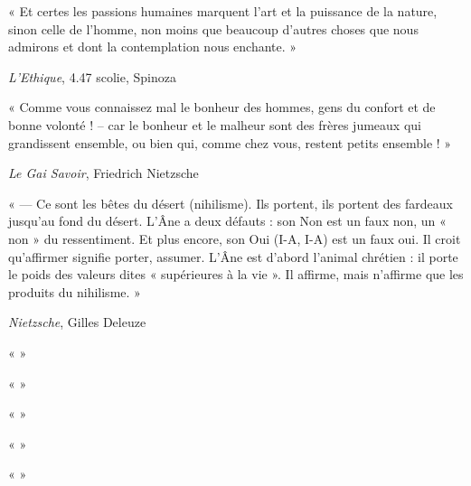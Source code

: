 \documentclass{article}
\begin{document}
\begin{center}« Et certes les passions humaines marquent l’art et la puissance de la nature, sinon celle de l’homme, non moins que beaucoup d’autres choses que nous admirons et dont la contemplation nous enchante. » \end{center}

\begin{flushright}\textit{L'Ethique}, 4.47 scolie, Spinoza\end{flushright}


\begin{center}« Comme vous connaissez mal le bonheur des hommes, gens du confort et de bonne volonté ! – car le bonheur et le malheur sont des frères jumeaux qui grandissent ensemble, ou bien qui, comme chez vous, restent petits ensemble ! » \end{center}

\begin{flushright}\textit{Le Gai Savoir}, Friedrich Nietzsche\end{flushright}

\begin{center}«  — Ce sont les bêtes du désert (nihilisme). Ils portent, ils portent des fardeaux jusqu’au fond du désert. L’Âne a deux défauts : son Non est un faux non, un « non » du ressentiment. Et plus encore, son Oui (I-A, I-A) est un faux oui. Il croit qu’affirmer signifie porter, assumer. L’Âne est d’abord l’animal chrétien : il porte le poids des valeurs dites « supérieures à la vie ». Il affirme, mais n’affirme que les produits du nihilisme. »\end{center}

\begin{flushright}\textit{Nietzsche}, Gilles Deleuze\end{flushright}

\begin{center}« »\end{center}

\begin{center}« »\end{center}

\begin{center}« »\end{center}

\begin{center}« »\end{center}

\begin{center}« »\end{center}
\end{document}
